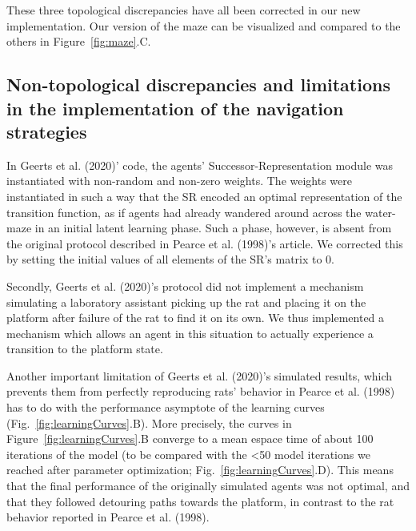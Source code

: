 These three topological discrepancies have all been corrected in our new implementation. Our version of the maze can be visualized and compared to the others in Figure~\ref{fig:maze}.C.

\subsection{Non-topological discrepancies and limitations in the implementation of the navigation strategies}

In Geerts et al. (2020)’ code, the agents’ Successor-Representation module was instantiated with non-random and non-zero weights. The weights were instantiated in such a way that the SR encoded an optimal representation of the transition function, as if agents had already wandered around across the water-maze in an initial latent learning phase. Such a phase, however, is absent from the original protocol described in Pearce et al. (1998)'s article. We corrected this by setting the initial values of all elements of the SR's matrix to 0.

Secondly, Geerts et al. (2020)’s protocol did not implement a mechanism simulating a laboratory assistant picking up the rat and placing it on the platform after failure of the rat to find it on its own. We thus implemented a mechanism which allows an agent in this situation to actually experience a transition to the platform state.

Another important limitation of Geerts et al. (2020)'s simulated results, which prevents them from perfectly reproducing rats' behavior in Pearce et al. (1998) has to do with the performance asymptote of the learning curves (Fig.~\ref{fig:learningCurves}.B). More precisely, the curves in Figure~\ref{fig:learningCurves}.B converge to a mean espace time of about 100 iterations of the model (to be compared with the <50 model iterations we reached after parameter optimization; Fig.~\ref{fig:learningCurves}.D). This means that the final performance of the originally simulated agents was not optimal, and that they followed detouring paths towards the platform, in contrast to the rat behavior reported in Pearce et al. (1998).

